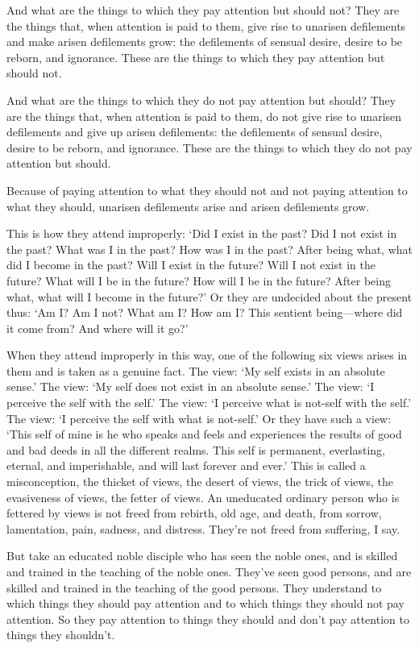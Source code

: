 \documentclass[12pt,openany]{book}%
\begin{document}
And what are the things to which they pay attention but should not? They are the things that, when attention is paid to them, give rise to unarisen defilements and make arisen defilements grow: the defilements of sensual desire, desire to be reborn, and ignorance. These are the things to which they pay attention but should not. 

And what are the things to which they do not pay attention but should? They are the things that, when attention is paid to them, do not give rise to unarisen defilements and give up arisen defilements: the defilements of sensual desire, desire to be reborn, and ignorance. These are the things to which they do not pay attention but should. 

Because of paying attention to what they should not and not paying attention to what they should, unarisen defilements arise and arisen defilements grow. 

This is how they attend improperly: ‘Did I exist in the past? Did I not exist in the past? What was I in the past? How was I in the past? After being what, what did I become in the past? Will I exist in the future? Will I not exist in the future? What will I be in the future? How will I be in the future? After being what, what will I become in the future?’ Or they are undecided about the present thus: ‘Am I? Am I not? What am I? How am I? This sentient being—where did it come from? And where will it go?’ 

When they attend improperly in this way, one of the following six views arises in them and is taken as a genuine fact. The view: ‘My self exists in an absolute sense.’ The view: ‘My self does not exist in an absolute sense.’ The view: ‘I perceive the self with the self.’ The view: ‘I perceive what is not-self with the self.’ The view: ‘I perceive the self with what is not-self.’ Or they have such a view: ‘This self of mine is he who speaks and feels and experiences the results of good and bad deeds in all the different realms. This self is permanent, everlasting, eternal, and imperishable, and will last forever and ever.’ This is called a misconception, the thicket of views, the desert of views, the trick of views, the evasiveness of views, the fetter of views. An uneducated ordinary person who is fettered by views is not freed from rebirth, old age, and death, from sorrow, lamentation, pain, sadness, and distress. They’re not freed from suffering, I say. 

But take an educated noble disciple who has seen the noble ones, and is skilled and trained in the teaching of the noble ones. They’ve seen good persons, and are skilled and trained in the teaching of the good persons. They understand to which things they should pay attention and to which things they should not pay attention. So they pay attention to things they should and don’t pay attention to things they shouldn’t. 
\end{document}
